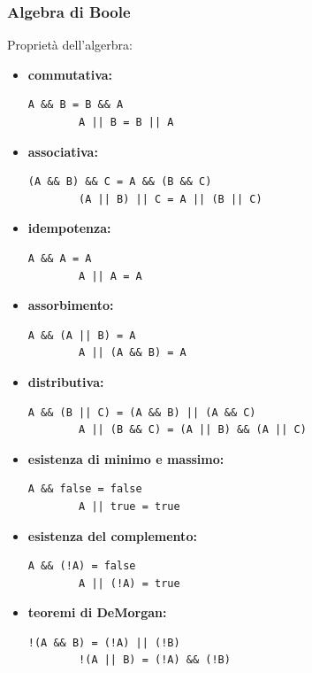 \documentclass[../main.tex]{subfiles}
\begin{document}
\subsubsection{Algebra di Boole}
Proprietà dell'algerbra:
\begin{itemize}
    \item \textbf{commutativa:}
    \begin{lstlisting}[style=java]
        A && B = B && A
        A || B = B || A
    \end{lstlisting}
    \item \textbf{associativa:}
    \begin{lstlisting}[style=java]
        (A && B) && C = A && (B && C)
        (A || B) || C = A || (B || C)
    \end{lstlisting}
    \item \textbf{idempotenza:}
    \begin{lstlisting}[style=java]
        A && A = A
        A || A = A
    \end{lstlisting}
    \item \textbf{assorbimento:}
    \begin{lstlisting}[style=java]
        A && (A || B) = A
        A || (A && B) = A
    \end{lstlisting}
    \item \textbf{distributiva:}
    \begin{lstlisting}[style=java]
        A && (B || C) = (A && B) || (A && C)
        A || (B && C) = (A || B) && (A || C)
    \end{lstlisting}
    \item \textbf{esistenza di minimo e massimo:}
    \begin{lstlisting}[style=java]
        A && false = false
        A || true = true
    \end{lstlisting}
    \item \textbf{esistenza del complemento:}
    \begin{lstlisting}[style=java]
        A && (!A) = false
        A || (!A) = true
    \end{lstlisting}
    \item \textbf{teoremi di DeMorgan:}
    \begin{lstlisting}[style=java]
        !(A && B) = (!A) || (!B)
        !(A || B) = (!A) && (!B)
    \end{lstlisting}
\end{itemize}

\vspace{1cm}
\end{document}
